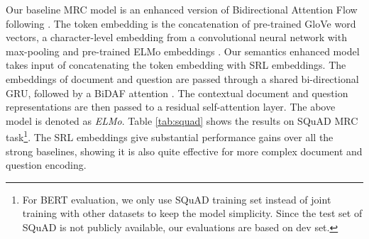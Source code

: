 \documentclass[11pt]{article}
\begin{document}
Our baseline MRC model is an enhanced version of Bidirectional Attention Flow \citep{Seo2016Bidirectional} following \citep{clark2018simple}. The token embedding is the concatenation of pre-trained GloVe word vectors, a character-level embedding from a convolutional neural network with max-pooling and pre-trained ELMo embeddings \citep{Peters2018ELMO}. Our semantics enhanced model takes input of concatenating the token embedding with SRL embeddings. The embeddings of document and question are passed through a shared bi-directional GRU, followed by a BiDAF attention \citep{Seo2016Bidirectional}. The contextual document and question representations are then passed to a residual self-attention layer. The above model is denoted as \emph{ELMo}. 
Table \ref{tab:squad} shows the results on SQuAD MRC task\footnote{For BERT evaluation, we only use SQuAD training set instead of joint training with other datasets to keep the model simplicity. Since the test set of SQuAD is not publicly available, our evaluations are based on dev set.}. The SRL embeddings give substantial performance gains over all the strong baselines, showing it is also quite effective for more complex document and question encoding.
\end{document}
